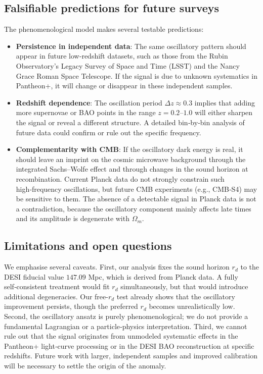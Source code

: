 \documentclass[10pt,a4paper,twocolumn]{article}
\begin{document}
\subsection{Falsifiable predictions for future surveys}
The phenomenological model makes several testable predictions:
\begin{itemize}
    \item \textbf{Persistence in independent data}: The same oscillatory pattern should appear in future low‑redshift datasets, such as those from the Rubin Observatory’s Legacy Survey of Space and Time (LSST) and the Nancy Grace Roman Space Telescope. If the signal is due to unknown systematics in Pantheon+, it will change or disappear in these independent samples.
    \item \textbf{Redshift dependence}: The oscillation period $\Delta z \approx 0.3$ implies that adding more supernovae or BAO points in the range $z=0.2$–$1.0$ will either sharpen the signal or reveal a different structure. A detailed bin‑by‑bin analysis of future data could confirm or rule out the specific frequency.
    \item \textbf{Complementarity with CMB}: If the oscillatory dark energy is real, it should leave an imprint on the cosmic microwave background through the integrated Sachs–Wolfe effect and through changes in the sound horizon at recombination. Current Planck data do not strongly constrain such high‑frequency oscillations, but future CMB experiments (e.g., CMB‑S4) may be sensitive to them. The absence of a detectable signal in Planck data is not a contradiction, because the oscillatory component mainly affects late times and its amplitude is degenerate with $\Omega_m$.
\end{itemize}

\subsection{Limitations and open questions}
We emphasise several caveats. First, our analysis fixes the sound horizon $r_d$ to the DESI fiducial value $147.09$ Mpc, which is derived from Planck data. A fully self‑consistent treatment would fit $r_d$ simultaneously, but that would introduce additional degeneracies. Our free-$r_d$ test already shows that the oscillatory improvement persists, though the preferred $r_d$ becomes unrealistically low. Second, the oscillatory ansatz is purely phenomenological; we do not provide a fundamental Lagrangian or a particle‑physics interpretation. Third, we cannot rule out that the signal originates from unmodeled systematic effects in the Pantheon+ light‑curve processing or in the DESI BAO reconstruction at specific redshifts. Future work with larger, independent samples and improved calibration will be necessary to settle the origin of the anomaly.
\end{document}
